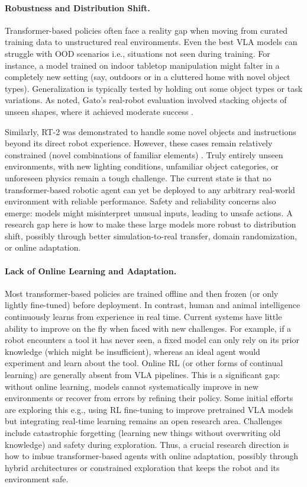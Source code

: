 \paragraph{Robustness and Distribution Shift.}

Transformer-based policies often face a reality gap when moving from curated training data to unstructured real environments. Even the best \ac{VLA} models can struggle with \ac{OOD} scenarios i.e., situations not seen during training. For instance, a model trained on indoor tabletop manipulation might falter in a completely new setting (say, outdoors or in a cluttered home with novel object types). Generalization is typically tested by holding out some object types or task variations. As noted, Gato’s real-robot evaluation involved stacking objects of unseen shapes, where it achieved moderate success \cite{GATO2022}.

Similarly, RT-2 was demonstrated to handle some novel objects and instructions beyond its direct robot experience. However, these cases remain relatively constrained (novel combinations of familiar elements) \cite{RT22023}. Truly entirely unseen environments, with new lighting conditions, unfamiliar object categories, or unforeseen physics remain a tough challenge. The current state is that no transformer-based robotic agent can yet be deployed to any arbitrary real-world environment with reliable performance. Safety and reliability concerns also emerge: models might misinterpret unusual inputs, leading to unsafe actions. A research gap here is how to make these large models more robust to distribution shift, possibly through better simulation-to-real transfer, domain randomization, or online adaptation.

\paragraph{Lack of Online Learning and Adaptation.}

Most transformer-based policies are trained offline and then frozen (or only lightly fine-tuned) before deployment. In contrast, human and animal intelligence continuously learns from experience in real time. Current systems have little ability to improve on the fly when faced with new challenges. For example, if a robot encounters a tool it has never seen, a fixed model can only rely on its prior knowledge (which might be insufficient), whereas an ideal agent would experiment and learn about the tool. Online \ac{RL} (or other forms of continual learning) are generally absent from \ac{VLA} pipelines. This is a significant gap: without online learning, models cannot systematically improve in new environments or recover from errors by refining their policy. Some initial efforts are exploring this e.g., using \ac{RL} fine-tuning to improve pretrained \ac{VLA} models \cite{IREVLA2025} but integrating real-time learning remains an open research area. Challenges include catastrophic forgetting (learning new things without overwriting old knowledge) and safety during exploration. Thus, a crucial research direction is how to imbue transformer-based agents with online adaptation, possibly through hybrid architectures or constrained exploration that keeps the robot and its environment safe.

